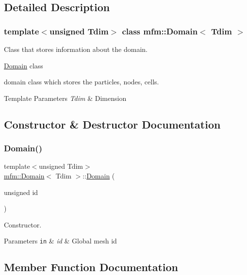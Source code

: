 \subsection{Detailed Description}
\subsubsection*{template$<$unsigned Tdim$>$\newline
class mfm\+::\+Domain$<$ Tdim $>$}

Class that stores information about the domain. 

\hyperlink{classmfm_1_1_domain}{Domain} class

domain class which stores the particles, nodes, cells. 
\begin{DoxyTemplParams}{Template Parameters}
{\em Tdim} & Dimension \\
\hline
\end{DoxyTemplParams}


\subsection{Constructor \& Destructor Documentation}
\mbox{\label{classmfm_1_1_domain_a84ffcd3a69703e5b6432a95dfcebbbd8}} 
\subsubsection{\texorpdfstring{Domain()}{Domain()}}
{\footnotesize\ttfamily template$<$unsigned Tdim$>$ \\
\hyperlink{classmfm_1_1_domain}{mfm\+::\+Domain}$<$ Tdim $>$\+::\hyperlink{classmfm_1_1_domain}{Domain} (\begin{DoxyParamCaption}\item[{unsigned}]{id }\end{DoxyParamCaption})}



Constructor. 


\begin{DoxyParams}[1]{Parameters}
\mbox{\tt in}  & {\em id} & Global mesh id \\
\hline
\end{DoxyParams}


\subsection{Member Function Documentation}
\mbox{\label{classmfm_1_1_domain_a0391235c4c353c37c550018e800d6c75}} 
